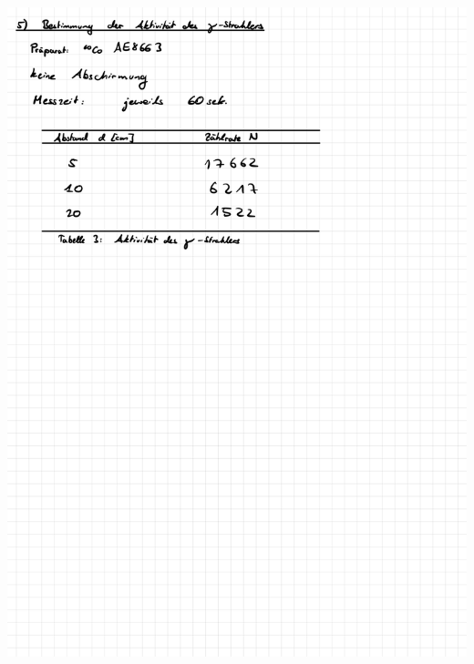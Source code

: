 \documentclass{article}
\begin{document}
\includegraphics[width=\textwidth]{graphics/mess5.jpg}
\newpage
\end{document}
